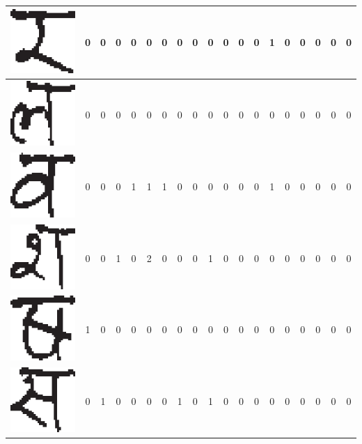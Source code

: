 \begin{table}[h]
\begin{tabular}{|c|c|c|c|c|c|c|c|c|c|c|c|c|c|c|c|c|c|c|}
\hline
\includegraphics[scale=0.25]{figures/datasets/nhcr/consonants/27ra} & 0 & 0 & 0 & 0 & 0 & 0 & 0 & 0 & 0 & 0 & 0 & 0 & 1 & 0 & 0 & 0 & 0 & 0\tabularnewline
\hline
\includegraphics[scale=0.25]{figures/datasets/nhcr/consonants/28la} & 0 & 0 & 0 & 0 & 0 & 0 & 0 & 0 & 0 & 0 & 0 & 0 & 0 & 0 & 0 & 0 & 0 & 0\tabularnewline
\hline
\includegraphics[scale=0.25]{figures/datasets/nhcr/consonants/29wa} & 0 & 0 & 0 & 1 & 1 & 1 & 0 & 0 & 0 & 0 & 0 & 0 & 1 & 0 & 0 & 0 & 0 & 0\tabularnewline
\hline
\includegraphics[scale=0.25]{figures/datasets/nhcr/consonants/30sa} & 0 & 0 & 1 & 0 & 2 & 0 & 0 & 0 & 1 & 0 & 0 & 0 & 0 & 0 & 0 & 0 & 0 & 0\tabularnewline
\hline
\includegraphics[scale=0.25]{figures/datasets/nhcr/consonants/31khasa} & 1 & 0 & 0 & 0 & 0 & 0 & 0 & 0 & 0 & 0 & 0 & 0 & 0 & 0 & 0 & 0 & 0 & 0\tabularnewline
\hline
\includegraphics[scale=0.25]{figures/datasets/nhcr/consonants/32saa} & 0 & 1 & 0 & 0 & 0 & 0 & 1 & 0 & 1 & 0 & 0 & 0 & 0 & 0 & 0 & 0 & 0 & 0\tabularnewline

\end{tabular}
\end{table}
